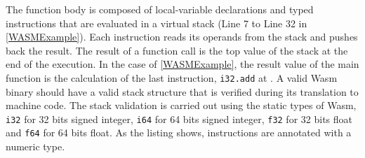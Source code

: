 The function body is composed of local-variable declarations and typed instructions that are evaluated in a virtual stack (Line 7 to Line 32 in \autoref{WASMExample}). Each instruction reads its operands from the stack and pushes back the result. The result of a function call is the top value of the stack at the end of the execution. In the case of \autoref{WASMExample}, the result value of the main function is the calculation of the last instruction, \texttt{i32.add} at . A valid Wasm  binary should have a valid stack structure that is verified during its translation to machine code. The stack validation is carried out using the static types of Wasm, \texttt{i32} for 32 bits signed integer, \texttt{i64} for 64 bits signed integer, \texttt{f32} for 32 bits float and \texttt{f64} for 64 bits float. As the listing shows, instructions are annotated with a numeric type.

\begin{code}
    \begin{minipage}[t]{0.45\linewidth}

\end{minipage}\hspace{10mm}
\begin{minipage}[t]{0.46\linewidth}
%

\end{minipage}






\end{code}

